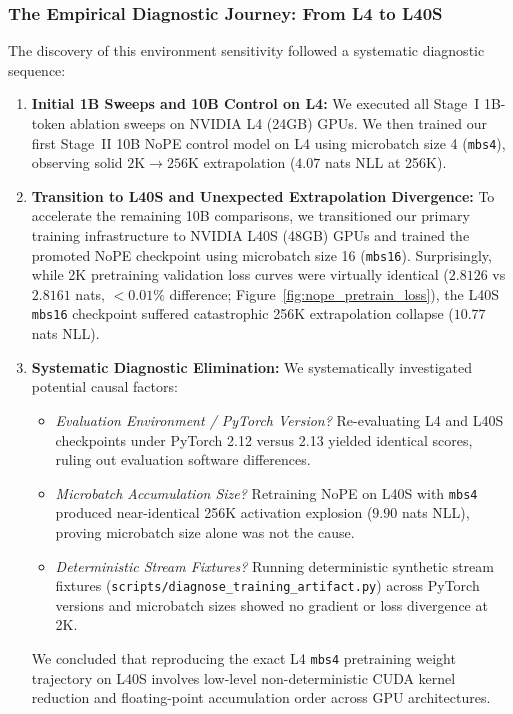 \documentclass{article} %
\begin{document}
\subsubsection{The Empirical Diagnostic Journey: From L4 to L40S}
The discovery of this environment sensitivity followed a systematic diagnostic sequence:
\begin{enumerate}
    \item \textbf{Initial 1B Sweeps and 10B Control on L4:} We executed all Stage~I 1B-token ablation sweeps on NVIDIA L4 (24GB) GPUs. We then trained our first Stage~II 10B NoPE control model on L4 using microbatch size 4 (\texttt{mbs4}), observing solid $2\text{K} \to 256\text{K}$ extrapolation ($4.07$ nats NLL at 256K).
    \item \textbf{Transition to L40S and Unexpected Extrapolation Divergence:} To accelerate the remaining 10B comparisons, we transitioned our primary training infrastructure to NVIDIA L40S (48GB) GPUs and trained the promoted NoPE checkpoint using microbatch size 16 (\texttt{mbs16}). Surprisingly, while 2K pretraining validation loss curves were virtually identical ($2.8126$ vs $2.8161$ nats, $<0.01\%$ difference; Figure~\ref{fig:nope_pretrain_loss}), the L40S \texttt{mbs16} checkpoint suffered catastrophic 256K extrapolation collapse ($10.77$ nats NLL).
    \item \textbf{Systematic Diagnostic Elimination:} We systematically investigated potential causal factors:
    \begin{itemize}
        \item \emph{Evaluation Environment / PyTorch Version?} Re-evaluating L4 and L40S checkpoints under PyTorch 2.12 versus 2.13 yielded identical scores, ruling out evaluation software differences.
        \item \emph{Microbatch Accumulation Size?} Retraining NoPE on L40S with \texttt{mbs4} produced near-identical 256K activation explosion ($9.90$ nats NLL), proving microbatch size alone was not the cause.
        \item \emph{Deterministic Stream Fixtures?} Running deterministic synthetic stream fixtures (\texttt{scripts/diagnose\_training\_artifact.py}) across PyTorch versions and microbatch sizes showed no gradient or loss divergence at 2K.
    \end{itemize}
    We concluded that reproducing the exact L4 \texttt{mbs4} pretraining weight trajectory on L40S involves low-level non-deterministic CUDA kernel reduction and floating-point accumulation order across GPU architectures.
\end{enumerate}
\end{document}
